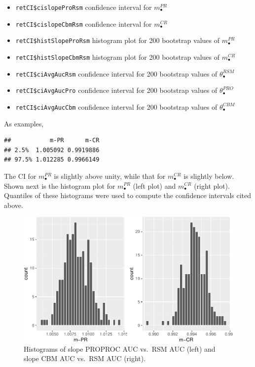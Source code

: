 \documentclass[
]{book}
\providecommand{\tightlist}{%
  \setlength{\itemsep}{0pt}\setlength{\parskip}{0pt}}
\begin{document}
\begin{itemize}
\tightlist
\item
  \texttt{retCI\$cislopeProRsm} confidence interval for \(m^{PR}_\bullet\)
\item
  \texttt{retCI\$cislopeCbmRsm} confidence interval for \(m^{CR}_\bullet\)
\item
  \texttt{retCI\$histSlopeProRsm} histogram plot for 200 bootstrap values of \(m^{PR}_\bullet\)
\item
  \texttt{retCI\$histSlopeCbmRsm} histogram plot for 200 bootstrap values of \(m^{CR}_\bullet\)
\item
  \texttt{retCI\$ciAvgAucRsm} confidence interval for 200 bootstrap values of \(\theta^{RSM}_\bullet\)
\item
  \texttt{retCI\$ciAvgAucPro} confidence interval for 200 bootstrap values of \(\theta^{PRO}_\bullet\)
\item
  \texttt{retCI\$ciAvgAucCbm} confidence interval for 200 bootstrap values of \(\theta^{CBM}_\bullet\)
\end{itemize}

As examples,

\begin{verbatim}
##           m-PR      m-CR
## 2.5%  1.005092 0.9919886
## 97.5% 1.012285 0.9966149
\end{verbatim}

The CI for \(m^{PR}_\bullet\) is slightly above unity, while that for \(m^{CR}_\bullet\) is slightly below. Shown next is the histogram plot for \(m^{PR}_\bullet\) (left plot) and \(m^{CR}_\bullet\) (right plot). Quantiles of these histograms were used to compute the confidence intervals cited above.

\begin{figure}
\centering
\includegraphics{19b-rsm-3-fits_files/figure-latex/rsm-3-fits-histo-slopes-1.pdf}
\caption{\label{fig:rsm-3-fits-histo-slopes}Histograms of slope PROPROC AUC vs.~RSM AUC (left) and slope CBM AUC vs.~RSM AUC (right).}
\end{figure}
\end{document}
